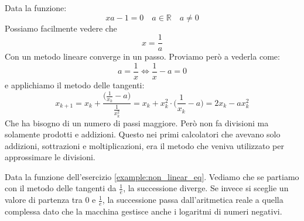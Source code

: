 \begin{example}
	Data la funzione:
	\begin{equation*}
		xa-1=0 \quad a \in \mathbb{R} \quad a \neq 0
	\end{equation*}
	Possiamo facilmente vedere che
	\begin{equation*}
		x=\frac{1}{a}
	\end{equation*}
	Con un metodo lineare converge in un passo. Proviamo però a vederla come:
	\begin{equation*}
		a=\frac{1}{x} \Leftrightarrow \frac{1}{x}-a=0
	\end{equation*}
	e applichiamo il metodo delle tangenti:
	\begin{equation*}
		x_{k+1}=x_k + \frac{\big(\frac{1}{x_k} - a\big)}{\frac{1}{x_k^2}} = x_k + x_k^2 \cdot \bigg(\frac{1}{x_k} - a\bigg) = 2x_k-ax_k^2
	\end{equation*}
	Che ha bisogno di un numero di passi maggiore. Però non fa divisioni ma solamente prodotti e addizioni. Questo nei primi calcolatori che avevano solo addizioni, sottrazioni e moltiplicazioni, era il metodo che veniva utilizzato per approssimare le divisioni.
\end{example}

\begin{example}
	Data la funzione dell'esercizio \ref{example:non_linear_eq}. Vediamo che se partiamo con il metodo delle tangenti da $\frac{1}{e}$, la successione diverge. Se invece si sceglie un valore di partenza tra $0$ e $\frac{1}{e}$, la successione passa dall'aritmetica reale a quella complessa dato che la macchina gestisce anche i logaritmi di numeri negativi.
\end{example}

